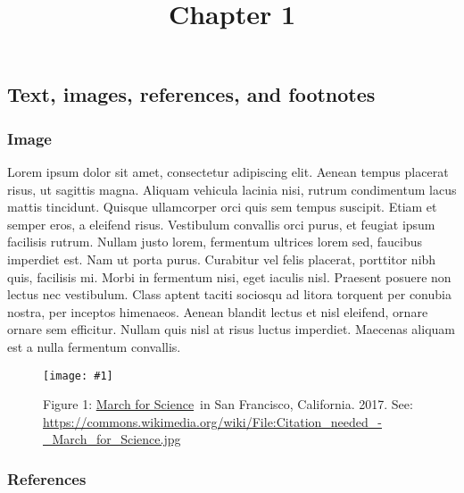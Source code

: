 \documentclass{article}
\newlength{\imgwidth}
\newcommand\scaledgraphics[2]{%
                
\settowidth{\imgwidth}{\texttt{[image: \#1]}}%
                
\setlength{\imgwidth}{\minof{\imgwidth}{#2\textwidth}}%
                
\texttt{[image: \#1]}%
                
}
\begin{document}
\title{Chapter 1}

\maketitle


\subsection{Text, images, references, and footnotes}\label{H5353869}



\subsubsection{Image}\label{H6448135}



Lorem ipsum dolor sit amet, consectetur adipiscing elit. Aenean tempus placerat risus, ut sagittis magna. Aliquam vehicula lacinia nisi, rutrum condimentum lacus mattis tincidunt. Quisque ullamcorper orci quis sem tempus suscipit. Etiam et semper eros, a eleifend risus. Vestibulum convallis orci purus, et feugiat ipsum facilisis rutrum. Nullam justo lorem, fermentum ultrices lorem sed, faucibus imperdiet est. Nam ut porta purus. Curabitur vel felis placerat, porttitor nibh quis, facilisis mi. Morbi in fermentum nisi, eget iaculis nisl. Praesent posuere non lectus nec vestibulum. Class aptent taciti sociosqu ad litora torquent per conubia nostra, per inceptos himenaeos. Aenean blandit lectus et nisl eleifend, ornare ornare sem efficitur. Nullam quis nisl at risus luctus imperdiet. Maecenas aliquam est a nulla fermentum convallis.

\begin{figure}
\scaledgraphics{e5c5f202-b1e2-4b15-98f9-a9082d225a6b.jpg}{1}
\caption*{Figure 1: \href{https://en.wikipedia.org/wiki/March_for_Science}{March for Science} in San Francisco, California. 2017. See: \href{https://commons.wikimedia.org/wiki/File:Citation_needed_-_March_for_Science.jpg}{https://commons.wikimedia.org/wiki/File:Citation\_needed\_-\_March\_for\_Science.jpg}}\label{F64353661}
\end{figure}


\subsubsection{References}\label{H153323}
\end{document}
